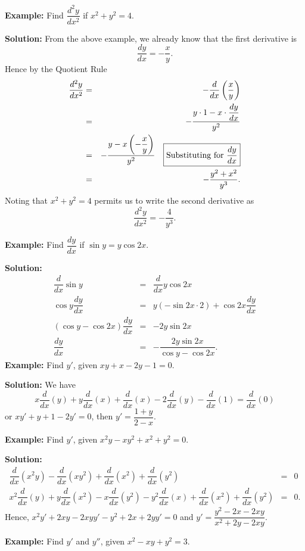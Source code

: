 \documentclass[titlepage,a4paper,12pt]{report}
\begin{document}
\noindent \textbf{Example:} Find $\dfrac{d^2y}{dx^2}$ if $x^2+y^2=4$.

\noindent \textbf{Solution:} From the above example, we already know that the first derivative is 
\[\dfrac{dy}{dx}=-\dfrac{x}{y}.\]
Hence by the Quotient Rule
\begin{eqnarray*}
\dfrac{d^2y}{dx^2}  &=& -\dfrac{d}{dx}\left(\dfrac{x}{y}\right)\\
&=& -\dfrac{y\cdot 1-x\cdot \dfrac{dy}{dx}}{y^2}\\
&=& -\dfrac{y-x\left(-\dfrac{x}{y}\right)}{y^2} \quad \hbox{\fbox{Substituting for $\dfrac{dy}{dx}$}}\\
&=& -\dfrac{y^2+x^2}{y^3}.
\end{eqnarray*}
Noting that $x^2+y^2=4$ permits us to write the second derivative as 
\[\dfrac{d^2y}{dx^2}=-\dfrac{4}{y^3}.\]


\noindent \textbf{Example:} Find $\dfrac{dy}{dx}$ if $\sin y=y\cos 2x$.

\noindent \textbf{Solution:} 
\begin{eqnarray*}
\dfrac{d}{dx}\sin y &=& \dfrac{d}{dx}y\cos 2x\\
\cos y \dfrac{dy}{dx} &=& y(-\sin 2x \cdot 2)+\cos 2x \dfrac{dy}{dx}\\
(\cos y-\cos 2x)\dfrac{dy}{dx} &=& -2y\sin 2x\\
\dfrac{dy}{dx} &=& -\dfrac{2y\sin 2x}{\cos y-\cos 2x}.
\end{eqnarray*}
\noindent \textbf{Example:} Find $y'$, given $xy+x-2y-1=0$.

\noindent \textbf{Solution:} We have 
\begin{equation*}
x\dfrac{d}{dx}(y)+y\dfrac{d}{dx}(x)+\dfrac{d}{dx}(x)-2\dfrac{d}{dx}(y)-\dfrac{d}{dx}(1)=\dfrac{d}{dx}(0)
\end{equation*}
or 
$xy'+y+1-2y'=0$, then $y'=\dfrac{1+y}{2-x}$.

\noindent \textbf{Example:} Find $y'$, given $x^2y-xy^2+x^2+y^2=0$.

\noindent \textbf{Solution:} 
\begin{eqnarray*}
\dfrac{d}{dx}(x^2y)-\dfrac{d}{dx}(xy^2)+\dfrac{d}{dx}(x^2)+\dfrac{d}{dx}(y^2) &=& 0\\
x^2\dfrac{d}{dx}(y)+y\dfrac{d}{dx}(x^2)-x\dfrac{d}{dx}(y^2)-y^2\dfrac{d}{dx}(x)+\dfrac{d}{dx}(x^2)+\dfrac{d}{dx}(y^2) 
&=& 0.
\end{eqnarray*}
Hence, $x^2y'+2xy-2xyy'-y^2+2x+2yy'=0$ and $y'=\dfrac{y^2-2x-2xy}{x^2+2y-2xy}$.

\noindent \textbf{Example:} Find $y'$ and $y''$, given $x^2-xy+y^2=3$.
\end{document}
